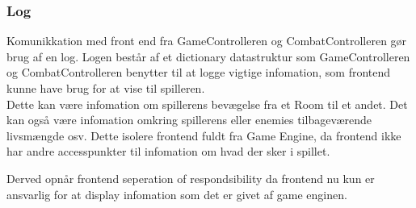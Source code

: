 \subsubsection{Log}
Komunikkation med front end fra GameControlleren og CombatControlleren
gør brug af en log.
Logen består af et dictionary datastruktur som GameControlleren og 
CombatControlleren benytter til at logge vigtige infomation, som 
frontend kunne have brug for at vise til spilleren. \\

\noindent Dette kan være infomation om spillerens bevægelse fra
et Room til et andet. Det kan også være infomation omkring spillerens
eller enemies tilbageværende livsmængde osv. Dette isolere frontend 
fuldt fra Game Engine, da frontend ikke har andre accesspunkter til
infomation om hvad der sker i spillet. 

Derved opnår frontend seperation of respondsibility da frontend nu 
kun er ansvarlig for at display infomation som det er givet af game
enginen.

\newpage
